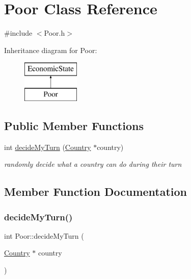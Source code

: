 \hypertarget{class_poor}{}\section{Poor Class Reference}
\label{class_poor}


{\ttfamily \#include $<$Poor.\+h$>$}

Inheritance diagram for Poor\+:\begin{figure}[H]
\begin{center}
\leavevmode
\includegraphics[height=2.000000cm]{class_poor}
\end{center}
\end{figure}
\subsection*{Public Member Functions}
\begin{DoxyCompactItemize}
\item 
int \mbox{\hyperlink{class_poor_a6dbe987b4d90c0e54b5e588d6f0e2ac7}{decide\+My\+Turn}} (\mbox{\hyperlink{class_country}{Country}} $\ast$country)
\begin{DoxyCompactList}\small\item\em randomly decide what a country can do during their turn \end{DoxyCompactList}\end{DoxyCompactItemize}


\subsection{Member Function Documentation}
\mbox{\label{class_poor_a6dbe987b4d90c0e54b5e588d6f0e2ac7}} 
\subsubsection{\texorpdfstring{decideMyTurn()}{decideMyTurn()}}
{\footnotesize\ttfamily int Poor\+::decide\+My\+Turn (\begin{DoxyParamCaption}\item[{\mbox{\hyperlink{class_country}{Country}} $\ast$}]{country }\end{DoxyParamCaption})\hspace{0.3cm}{\ttfamily [virtual]}}



